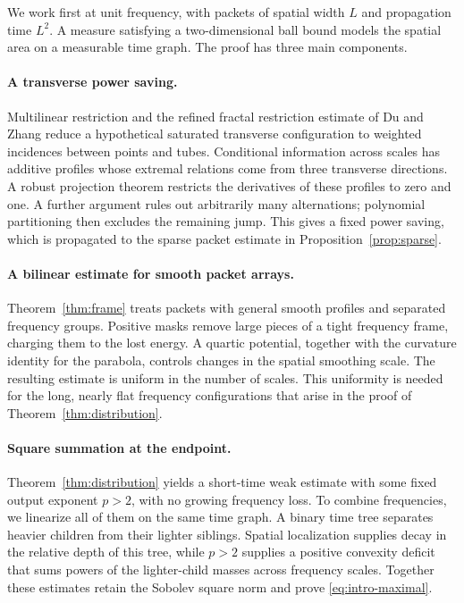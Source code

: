 We work first at unit frequency, with packets of spatial width $L$ and
propagation time $L^2$. A measure satisfying a two-dimensional ball bound
models the spatial area on a measurable time graph. The proof has three
main components.

\paragraph{A transverse power saving.}
Multilinear restriction \cite{BCT06} and the refined fractal restriction
estimate of Du and Zhang \cite[Theorem~1.6]{DZ19} reduce a hypothetical
saturated transverse configuration to weighted incidences between points
and tubes.
Conditional information across scales has additive profiles whose
extremal relations come from three transverse directions. A robust
projection theorem \cite[Theorem~1]{He20} restricts the derivatives of
these profiles to zero
and one. A further argument rules out arbitrarily many alternations;
polynomial partitioning \cite[Theorem~4.1]{GK15} then excludes the
remaining jump. This gives a
fixed power saving, which is propagated to the sparse packet estimate in
Proposition~\ref{prop:sparse}.

\paragraph{A bilinear estimate for smooth packet arrays.}
Theorem~\ref{thm:frame} treats packets with general smooth profiles and
separated frequency groups. Positive masks remove large pieces of a tight
frequency frame, charging them to the lost energy. A quartic potential,
together with the curvature identity for the parabola, controls changes
in the spatial smoothing scale. The resulting estimate is uniform in the
number of scales. This uniformity is needed for the long, nearly flat
frequency configurations that arise in the proof of
Theorem~\ref{thm:distribution}.

\paragraph{Square summation at the endpoint.}
Theorem~\ref{thm:distribution} yields a short-time weak estimate with some
fixed output exponent $p>2$, with no growing frequency loss. To combine
frequencies, we linearize all of them on the same time graph. A binary time
tree separates heavier children from their lighter siblings. Spatial
localization supplies decay in the relative depth of this tree, while
$p>2$ supplies a positive convexity deficit that sums powers of the
lighter-child masses across frequency scales. Together these estimates
retain the Sobolev square norm and prove \eqref{eq:intro-maximal}.

